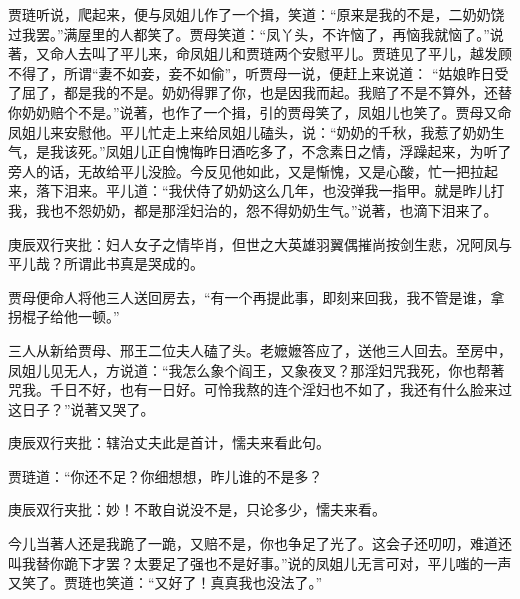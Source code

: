 \begin{parag}


    贾琏听说，爬起来，便与凤姐儿作了一个揖，笑道：“原来是我的不是，二奶奶饶过我罢。”满屋里的人都笑了。贾母笑道：“凤丫头，不许恼了，再恼我就恼了。”说著，又命人去叫了平儿来，命凤姐儿和贾琏两个安慰平儿。贾琏见了平儿，越发顾不得了，所谓“妻不如妾，妾不如偷”，听贾母一说，便赶上来说道： “姑娘昨日受了屈了，都是我的不是。奶奶得罪了你，也是因我而起。我赔了不是不算外，还替你奶奶赔个不是。”说著，也作了一个揖，引的贾母笑了，凤姐儿也笑了。贾母又命凤姐儿来安慰他。平儿忙走上来给凤姐儿磕头，说：“奶奶的千秋，我惹了奶奶生气，是我该死。”凤姐儿正自愧悔昨日酒吃多了，不念素日之情，浮躁起来，为听了旁人的话，无故给平儿没脸。今反见他如此，又是惭愧，又是心酸，忙一把拉起来，落下泪来。平儿道：“我伏侍了奶奶这么几年，也没弹我一指甲。就是昨儿打我，我也不怨奶奶，都是那淫妇治的，怨不得奶奶生气。”说著，也滴下泪来了。\begin{note}庚辰双行夹批：妇人女子之情毕肖，但世之大英雄羽翼偶摧尚按剑生悲，况阿凤与平儿哉？所谓此书真是哭成的。\end{note}贾母便命人将他三人送回房去，“有一个再提此事，即刻来回我，我不管是谁，拿拐棍子给他一顿。”
\end{parag}


\begin{parag}


    三人从新给贾母、邢王二位夫人磕了头。老嬷嬷答应了，送他三人回去。至房中，凤姐儿见无人，方说道：“我怎么象个阎王，又象夜叉？那淫妇咒我死，你也帮著咒我。千日不好，也有一日好。可怜我熬的连个淫妇也不如了，我还有什么脸来过这日子？”说著又哭了。\begin{note}庚辰双行夹批：辖治丈夫此是首计，懦夫来看此句。\end{note}贾琏道：“你还不足？你细想想，昨儿谁的不是多？\begin{note}庚辰双行夹批：妙！不敢自说没不是，只论多少，懦夫来看。\end{note}今儿当著人还是我跪了一跪，又赔不是，你也争足了光了。这会子还叨叨，难道还叫我替你跪下才罢？太要足了强也不是好事。”说的凤姐儿无言可对，平儿嗤的一声又笑了。贾琏也笑道：“又好了！真真我也没法了。”
\end{parag}


